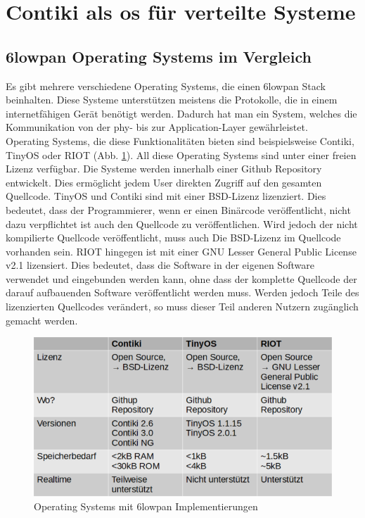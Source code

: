 	
	\section{Contiki als \ac{os} für verteilte Systeme}
	\subsection{\ac{6lowpan} Operating Systems im Vergleich}
	Es gibt mehrere  verschiedene Operating Systems, die einen \ac{6lowpan} Stack beinhalten. Diese Systeme unterstützen meistens die Protokolle, die in einem internetfähigen Gerät benötigt werden. Dadurch hat man ein System, welches die Kommunikation von der \ac{phy}- bis zur Application-Layer gewährleistet.\\
	Operating Systems, die diese Funktionalitäten bieten sind beispielsweise Contiki, TinyOS oder RIOT (Abb. \ref{os6lowpan}). All diese Operating Systems sind unter einer freien Lizenz verfügbar. Die Systeme werden innerhalb einer Github Repository entwickelt. Dies ermöglicht jedem User direkten Zugriff auf den gesamten Quellcode. TinyOS und Contiki sind mit einer BSD-Lizenz lizenziert. Dies bedeutet, dass der Programmierer, wenn er einen Binärcode veröffentlicht, nicht dazu verpflichtet ist auch den Quellcode zu veröffentlichen. Wird jedoch der nicht kompilierte Quellcode veröffentlicht, muss auch Die BSD-Lizenz im Quellcode vorhanden sein. RIOT hingegen ist mit einer GNU Lesser General Public License v2.1 lizensiert. Dies bedeutet, dass die Software in der eigenen Software verwendet und eingebunden werden kann, ohne dass der komplette Quellcode der darauf aufbauenden Software veröffentlicht werden muss. Werden jedoch Teile des lizenzierten Quellcodes verändert, so muss dieser Teil anderen Nutzern zugänglich gemacht werden.\\
	\begin{figure}
		\centering
		\includegraphics[scale=1]{Grafiken-Julian/OperatingSystemsVergleich.png}
		\caption{Operating Systems mit \ac{6lowpan} Implementierungen}
		\label{os6lowpan}
	\end{figure}
